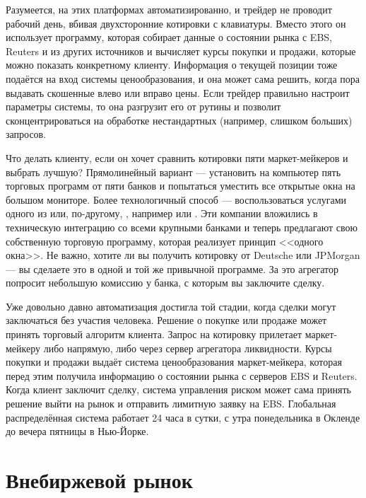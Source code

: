Разумеется,  на этих платформах
автоматизированно, и трейдер не проводит рабочий день, вбивая двухсторонние
котировки с клавиатуры. Вместо этого он использует программу, которая собирает
данные о состоянии рынка с EBS, Reuters и из других источников и вычисляет курсы
покупки и продажи, которые можно показать конкретному клиенту. Информация о
текущей позиции тоже подаётся на вход системы ценообразования, и она может сама
решить, когда пора выдавать скошенные влево или вправо цены. Если трейдер
правильно настроит параметры системы, то она разгрузит его от рутины и позволит
сконцентрироваться на обработке нестандартных (например, слишком больших)
запросов.

Что делать клиенту, если он хочет сравнить котировки пяти маркет-мейкеров и
выбрать лучшую? Прямолинейный вариант --- установить на компьютер пять торговых
программ от пяти банков и попытаться уместить все открытые окна на большом
мониторе. Более технологичный способ --- воспользоваться услугами одного из
 или, по-другому,
, например
 или
.
Эти компании вложились в техническую интеграцию со всеми крупными банками и
теперь предлагают свою собственную торговую программу, которая реализует принцип
<<одного окна>>. Не важно, хотите ли вы получить котировку от Deutsche или
JPMorgan --- вы сделаете это в одной и той же привычной программе. За это
агрегатор попросит небольшую комиссию у банка, с которым вы заключите сделку.

Уже довольно давно автоматизация достигла той стадии, когда сделки могут
заключаться без участия человека. Решение о покупке или продаже может принять
торговый алгоритм клиента. Запрос на котировку прилетает маркет-мейкеру либо
напрямую, либо через сервер агрегатора ликвидности. Курсы покупки и продажи
выдаёт система ценообразования маркет-мейкера, которая перед этим получила
информацию о состоянии рынка с серверов EBS и Reuters. Когда клиент заключит
сделку, система управления риском может сама принять решение выйти на рынок и
отправить лимитную заявку на EBS. Глобальная распределённая система работает 24
часа в сутки, с утра понедельника в Окленде до вечера пятницы в Нью-Йорке.

\section*{Внебиржевой рынок}

